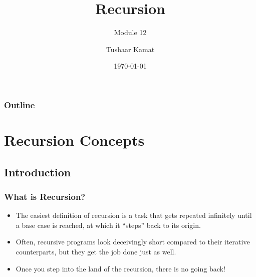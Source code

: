 \documentclass[fleqn, t]{beamer}
\title{Recursion}
\subtitle{Module 12}
\author{Tushaar Kamat}
\date{\today}
\begin{document}
\maketitle

\begin{frame}
  \frametitle{Outline}
  \tableofcontents
\end{frame}

\section{Recursion Concepts}
\subsection{Introduction}
\begin{frame}
  \frametitle{What is Recursion?}
  \begin{itemize}[<+->]
  \item The easiest definition of recursion is a task that gets repeated
    infinitely until a base case is reached, at which it ``steps'' back to its
    origin. 
  \item Often, recursive programs look deceivingly short compared to their
    iterative counterparts, but they get the job done just as well.
  \item Once you step into the land of the recursion, there is no going back!
  \end{itemize}
  \begin{figure}
  \end{figure}

\end{frame}
\end{document}
